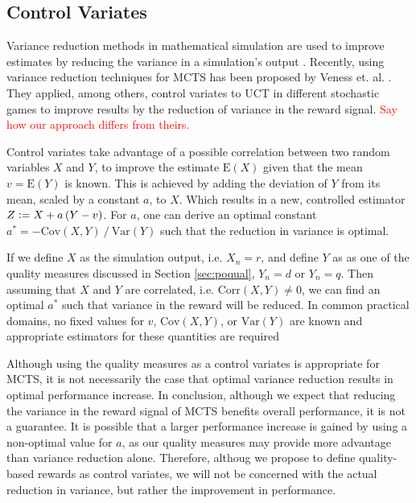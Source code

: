 \documentclass{ecai2014}
\newcommand\todo[1]{\textcolor{red}{#1}}
\newcommand{\E}[1]{\mathrm{E}\left( #1 \right)}
\newcommand{\Var}[1]{\mathrm{Var}\left( #1 \right)}
\newcommand{\Cov}[1]{\mathrm{Cov}\left( #1 \right)}
\newcommand{\Corr}[1]{\mathrm{Corr}\left( #1 \right)}
\newcommand{\defeq}{\vcentcolon=}
\begin{document}
\subsection{Control Variates}
Variance reduction methods in mathematical simulation are used to improve estimates by reducing the variance in a simulation's output \cite{kelton2000simulation}. Recently, using variance reduction techniques for MCTS has been proposed by Veness et. al. \cite{Veness11variance}. They applied, among others, control variates to UCT in different stochastic games to improve results by the reduction of variance in the reward signal. \todo{Say how our approach differs from theirs.}

Control variates take advantage of a possible correlation between two random variables $X$ and $Y$, to improve the estimate $\E{X}$ given that the mean $v=\E{Y}$ is known. This is achieved by adding the deviation of $Y$ from its mean, scaled by a constant $a$, to $X$. Which results in a new, controlled estimator $Z\defeq X+a\left(Y-v\right)$. For $a$, one can derive an optimal constant $a^*=-\Cov{X,Y}\mathbin{/}\Var{Y}$ such that the reduction in variance is optimal.

If we define $X$ as the simulation output, i.e. $X_n=r$, and define $Y$ as as one of the quality measures discussed in Section \ref{sec:poqual}, $Y_n=d$ or $Y_n=q$. Then assuming that $X$ and $Y$ are correlated, i.e. $\Corr{X,Y}\neq0$, we can find an optimal $a^*$ such that variance in the reward will be reduced. In common practical domains, no fixed values for $v$, $\Cov{X,Y}$, or $\Var{Y}$ are known and appropriate estimators for these quantities are required

Although using the quality measures as a control variates is appropriate for MCTS, it is not necessarily the case that optimal variance reduction results in optimal performance increase. In conclusion, although we expect that reducing the variance in the reward signal of MCTS benefits overall performance, it is not a guarantee. It is possible that a larger performance increase is gained by using a non-optimal value for $a$, as our quality measures may provide more advantage than variance reduction alone. Therefore, althoug we propose to define quality-based rewards as control variates, we will not be concerned with the actual reduction in variance, but rather the improvement in performance.
\end{document}
